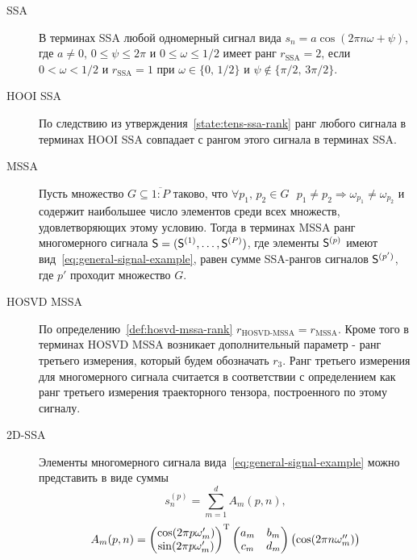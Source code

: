 \documentclass[specialist,
    substylefile = spbu_report.rtx,
    subf,href,colorlinks=true, 12pt]{disser}
\theoremstyle{plain}
\theoremstyle{definition}
\theoremstyle{remark}
\begin{document}
    \begin{description}
        \item[SSA] В терминах SSA любой одномерный сигнал вида $s_n = a \cos(2\pi n \omega + \psi)$, где $a\ne 0$,
        $0 \leqslant \psi \leqslant 2\pi$ и $0 \leqslant \omega \leqslant 1/2$ имеет ранг
        $r_\text{SSA} = 2$, если $0 < \omega < 1/2$ и $r_\text{SSA} = 1$ при $\omega \in \{0,\, 1/2\}$ и
        $\psi \notin \{\pi / 2,\, 3\pi / 2\}$.
        \item[HOOI SSA] По следствию из утверждения~\ref{state:tens-ssa-rank} ранг любого сигнала в терминах
        HOOI SSA совпадает с рангом этого сигнала в терминах SSA\@.
        \item[MSSA] Пусть множество $G \subseteq \overline{1:P}$ таково, что $\forall p_1,\, p_2 \in G ~~~
        p_1 \ne p_2 \Rightarrow \omega_{p_1} \ne \omega_{p_2}$ и содержит наибольшее число элементов
        среди всех множеств, удовлетворяющих этому условию.
        Тогда в терминах MSSA ранг многомерного сигнала
        $\mathsf{S} = (\mathsf{S}^{(1)}, \ldots, \mathsf{S}^{(P)})$, где элементы $\mathsf{S}^{(p)}$ имеют вид~\eqref{eq:general-signal-example},
        равен сумме SSA-рангов сигналов $\mathsf{S}^{(p')}$, где $p'$ проходит множество $G$.
        \item[HOSVD MSSA] По определению~\ref{def:hosvd-mssa-rank} $r_\text{HOSVD-MSSA} = r_\text{MSSA}$.
        Кроме того в терминах HOSVD MSSA возникает дополнительный параметр - ранг третьего измерения, который
        будем обозначать $r_3$.
        Ранг третьего измерения для многомерного сигнала считается в соответствии с определением как
        ранг третьего измерения траекторного тензора, построенного по этому сигналу.
        \item[2D-SSA] Элементы многомерного сигнала вида~\eqref{eq:general-signal-example} можно
        представить в виде суммы
        \[
            s^{(p)}_n = \sum_{m=1}^{d} A_m(p, n),
        \]
        \[
            A_m(p, n) =
            \begin{pmatrix}
                \cos(2\pi p\omega_m') \\
                \sin(2\pi p\omega_m')
            \end{pmatrix}^{\mathrm{T}}
            \begin{pmatrix}
                a_m & b_m \\
                c_m & d_m
            \end{pmatrix}
            \begin{pmatrix}
                \cos(2\pi n\omega_m'') \\

\end{pmatrix}\]
\end{description}
\end{document}
